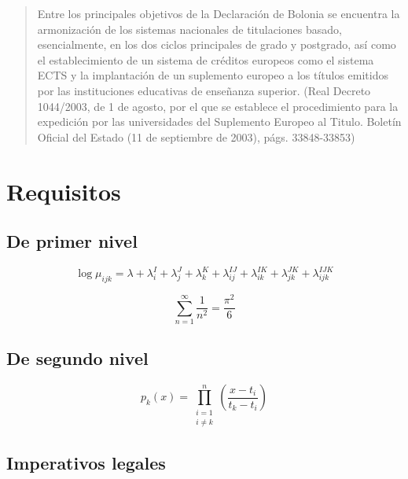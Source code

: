 \documentclass[12pt]{report} %
\begin{document}
\lipsum[9-10]

\blockquote{Entre los principales objetivos de la Declaración de Bolonia se encuentra la armonización de los sistemas nacionales de titulaciones basado, esencialmente, en los dos ciclos principales de grado y postgrado, así como	el establecimiento de un sistema de créditos europeos como el sistema ECTS y la implantación de un suplemento europeo a los títulos emitidos por las instituciones educativas de  enseñanza  superior. (Real  Decreto  1044/2003,  de  1  de  agosto,  por  el  que  se  establece  el  procedimiento para la expedición por las universidades del Suplemento Europeo al Titulo. Boletín Oficial del Estado (11 de septiembre de 2003), págs. 33848-33853)}

\lipsum[20-22]

\section{Requisitos}

\lipsum[15]

\subsection{De primer nivel}
\lipsum[15-16]

\begin{equation} %
\log \mu_{ijk}= \lambda + \lambda_i ^I + \lambda_j ^J+\lambda_k ^K+\lambda_{ij} ^{IJ}+\lambda_{ik} ^{IK}+\lambda_{jk} ^{JK}+\lambda_{ijk} ^{IJK}
\end{equation}

\lipsum[17]
\begin{equation}
	\sum_{n=1}^\infty\frac{1}{n^2}=\frac{\pi^2}{6}
\end{equation}


\lipsum[18]
	
\subsection{De segundo nivel}
\lipsum[8]
\begin{equation}
p_k(x)=\prod_{\substack{i=1\\i\ne k}}^n
\left(\frac{x-t_i}{t_k-t_i}\right)
\end{equation}

\lipsum[9]

\subsection{Imperativos legales}
\lipsum[8]
\end{document}
